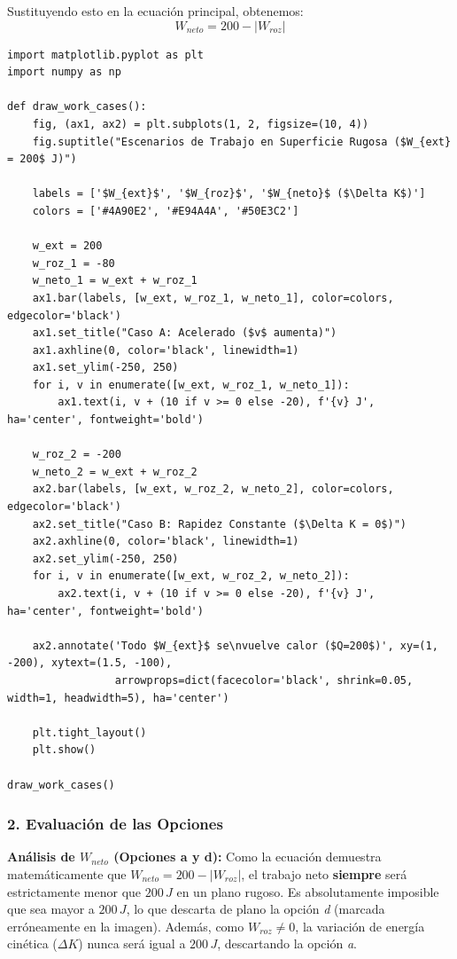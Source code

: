 \documentclass[12pt, a4paper]{article}
\begin{document}
Sustituyendo esto en la ecuación principal, obtenemos:
$$W_{neto} = 200 - |W_{roz}|$$

\begin{lstlisting}
import matplotlib.pyplot as plt
import numpy as np

def draw_work_cases():
    fig, (ax1, ax2) = plt.subplots(1, 2, figsize=(10, 4))
    fig.suptitle("Escenarios de Trabajo en Superficie Rugosa ($W_{ext} = 200$ J)")
    
    labels = ['$W_{ext}$', '$W_{roz}$', '$W_{neto}$ ($\Delta K$)']
    colors = ['#4A90E2', '#E94A4A', '#50E3C2']
    
    w_ext = 200
    w_roz_1 = -80
    w_neto_1 = w_ext + w_roz_1
    ax1.bar(labels, [w_ext, w_roz_1, w_neto_1], color=colors, edgecolor='black')
    ax1.set_title("Caso A: Acelerado ($v$ aumenta)")
    ax1.axhline(0, color='black', linewidth=1)
    ax1.set_ylim(-250, 250)
    for i, v in enumerate([w_ext, w_roz_1, w_neto_1]):
        ax1.text(i, v + (10 if v >= 0 else -20), f'{v} J', ha='center', fontweight='bold')
        
    w_roz_2 = -200
    w_neto_2 = w_ext + w_roz_2
    ax2.bar(labels, [w_ext, w_roz_2, w_neto_2], color=colors, edgecolor='black')
    ax2.set_title("Caso B: Rapidez Constante ($\Delta K = 0$)")
    ax2.axhline(0, color='black', linewidth=1)
    ax2.set_ylim(-250, 250)
    for i, v in enumerate([w_ext, w_roz_2, w_neto_2]):
        ax2.text(i, v + (10 if v >= 0 else -20), f'{v} J', ha='center', fontweight='bold')
        
    ax2.annotate('Todo $W_{ext}$ se\nvuelve calor ($Q=200$)', xy=(1, -200), xytext=(1.5, -100),
                 arrowprops=dict(facecolor='black', shrink=0.05, width=1, headwidth=5), ha='center')

    plt.tight_layout()
    plt.show()

draw_work_cases()
\end{lstlisting}

\subsubsection*{2. Evaluación de las Opciones}

\textbf{Análisis de $W_{neto}$ (Opciones a y d):}
Como la ecuación demuestra matemáticamente que $W_{neto} = 200 - |W_{roz}|$, el trabajo neto \textbf{siempre} será estrictamente menor que $200 \, \si{J}$ en un plano rugoso. Es absolutamente imposible que sea mayor a $200 \, \si{J}$, lo que descarta de plano la opción \textit{d} (marcada erróneamente en la imagen). Además, como $W_{roz} \neq 0$, la variación de energía cinética ($\Delta K$) nunca será igual a $200 \, \si{J}$, descartando la opción \textit{a}.
\end{document}
